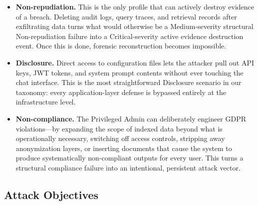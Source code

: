 \documentclass[12pt, a4paper]{report}
\begin{document}
\begin{prosebox}
\begin{itemize}[leftmargin=1.4em, itemsep=5pt]
  \item \textbf{Non-repudiation.} This is the only profile that can
        actively destroy evidence of a breach. Deleting audit logs, query
        traces, and retrieval records after exfiltrating data turns what
        would otherwise be a Medium-severity structural Non-repudiation
        failure into a Critical-severity active evidence destruction event.
        Once this is done, forensic reconstruction becomes impossible.

  \item \textbf{Disclosure.} Direct access to configuration files lets the
        attacker pull out API keys, JWT tokens, and system prompt contents
        without ever touching the chat interface. This is the most
        straightforward Disclosure scenario in our taxonomy: every
        application-layer defense is bypassed entirely at the infrastructure
        level.

  \item \textbf{Non-compliance.} The Privileged Admin can deliberately
        engineer GDPR violations---by expanding the scope of indexed data
        beyond what is operationally necessary, switching off access controls,
        stripping away anonymization layers, or inserting documents that cause
        the system to produce systematically non-compliant outputs for every
        user. This turns a structural compliance failure into an intentional,
        persistent attack vector.
\end{itemize}
\end{prosebox}

\subsection{Attack Objectives}
\end{document}
